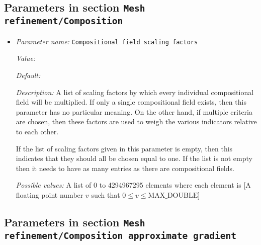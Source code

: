 \subsection{Parameters in section \tt Mesh refinement/Composition}
\label{parameters:Mesh_20refinement/Composition}

\begin{itemize}
\item {\it Parameter name:} {\tt Compositional field scaling factors}
\label{parameters:Mesh refinement/Composition/Compositional field scaling factors}


{\it Value:} 


{\it Default:} 


{\it Description:} A list of scaling factors by which every individual compositional field will be multiplied. If only a single compositional field exists, then this parameter has no particular meaning. On the other hand, if multiple criteria are chosen, then these factors are used to weigh the various indicators relative to each other. 

If the list of scaling factors given in this parameter is empty, then this indicates that they should all be chosen equal to one. If the list is not empty then it needs to have as many entries as there are compositional fields.


{\it Possible values:} A list of 0 to 4294967295 elements where each element is [A floating point number $v$ such that $0 \leq v \leq \text{MAX\_DOUBLE}$]
\end{itemize}

\subsection{Parameters in section \tt Mesh refinement/Composition approximate gradient}
\label{parameters:Mesh_20refinement/Composition_20approximate_20gradient}

